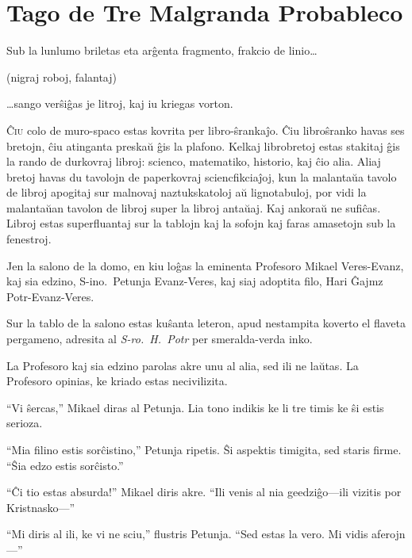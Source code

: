 \chapter{Tago de Tre Malgranda Probableco}

\begin{chapterOpeningQuote}
\noindent
Sub la lunlumo briletas eta arĝenta fragmento, frakcio de linio…

\vspace*{2ex}
(nigraj roboj, falantaj)

\vspace*{2ex}
…sango verŝiĝas je litroj, kaj iu kriegas vorton.
\end{chapterOpeningQuote}

\lettrine{Ĉ}{iu} colo de muro-spaco estas kovrita per libro-ŝrankaĵo. Ĉiu libroŝranko havas ses bretojn, ĉiu atinganta preskaŭ ĝis la plafono. Kelkaj librobretoj estas stakitaj ĝis la rando de durkovraj libroj: scienco, matematiko, historio, kaj ĉio alia. Aliaj bretoj havas du tavolojn de paperkovraj sciencfikciaĵoj, kun la malantaŭa tavolo de libroj apogitaj sur malnovaj naztukskatoloj aŭ lignotabuloj, por vidi la malantaŭan tavolon de libroj super la libroj antaŭaj. Kaj ankoraŭ ne sufiĉas. Libroj estas superfluantaj sur la tablojn kaj la sofojn kaj faras amasetojn sub la fenestroj.

Jen la salono de la domo, en kiu loĝas la eminenta Profesoro Mikael Veres\nobreakdash-Evanz, kaj sia edzino, S\nobreakdash-ino.~Petunja Evanz\nobreakdash-Veres, kaj siaj adoptita filo, Hari Ĝajmz Potr\nobreakdash-Evanz\nobreakdash-Veres.

Sur la tablo de la salono estas kuŝanta leteron, apud nestampita koverto el flaveta pergameno, adresita al \emph{S\nobreakdash-ro.~H.~Potr} per smeralda-verda inko.

La Profesoro kaj sia edzino parolas akre unu al alia, sed ili ne laŭtas. La Profesoro opinias, ke kriado estas necivilizita.

“Vi ŝercas,” Mikael diras al Petunja. Lia tono indikis ke li tre timis ke ŝi estis serioza.

“Mia filino estis sorĉistino,” Petunja ripetis. Ŝi aspektis timigita, sed staris firme. “Ŝia edzo estis sorĉisto.”

“Ĉi tio estas absurda!” Mikael diris akre. “Ili venis al nia geedziĝo—ili vizitis por Kristnasko—”

“Mi diris al ili, ke vi ne sciu,” flustris Petunja. “Sed estas la vero. Mi vidis aferojn—”

